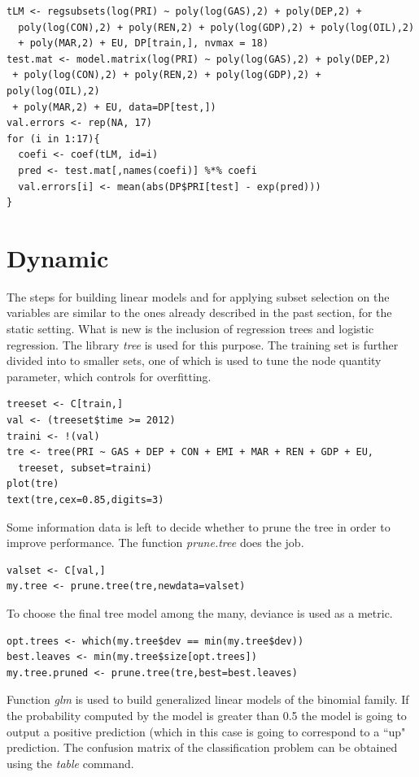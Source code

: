 \documentclass[a4paper,12pt]{book}
\begin{document}
\begin{verbatim}
tLM <- regsubsets(log(PRI) ~ poly(log(GAS),2) + poly(DEP,2) +
  poly(log(CON),2) + poly(REN,2) + poly(log(GDP),2) + poly(log(OIL),2)
  + poly(MAR,2) + EU, DP[train,], nvmax = 18)
test.mat <- model.matrix(log(PRI) ~ poly(log(GAS),2) + poly(DEP,2)
 + poly(log(CON),2) + poly(REN,2) + poly(log(GDP),2) + poly(log(OIL),2)
 + poly(MAR,2) + EU, data=DP[test,])
val.errors <- rep(NA, 17)
for (i in 1:17){
  coefi <- coef(tLM, id=i)
  pred <- test.mat[,names(coefi)] %*% coefi
  val.errors[i] <- mean(abs(DP$PRI[test] - exp(pred)))
}
\end{verbatim}

\section*{Dynamic}

The steps for building linear models and for applying subset selection on the variables are similar to the ones already described in the past section, for the static setting. What is new is the inclusion of regression trees and logistic regression. The library \textit{tree} is used for this purpose. The training set is further divided into to smaller sets, one of which is used to tune the node quantity parameter, which controls for overfitting.

\begin{verbatim}
treeset <- C[train,]
val <- (treeset$time >= 2012)
traini <- !(val)
tre <- tree(PRI ~ GAS + DEP + CON + EMI + MAR + REN + GDP + EU,
  treeset, subset=traini)
plot(tre)
text(tre,cex=0.85,digits=3)
\end{verbatim}

Some information data is left to decide whether to prune the tree in order to improve performance. The function \textit{prune.tree} does the job.

\begin{verbatim}
valset <- C[val,]
my.tree <- prune.tree(tre,newdata=valset)
\end{verbatim}

To choose the final tree model among the many, deviance is used as a metric.

\begin{verbatim}
opt.trees <- which(my.tree$dev == min(my.tree$dev))
best.leaves <- min(my.tree$size[opt.trees])
my.tree.pruned <- prune.tree(tre,best=best.leaves)
\end{verbatim}

Function \textit{glm} is used to build generalized linear models of the binomial family. If the probability computed by the model is greater than 0.5 the model is going to output a positive prediction (which in this case is going to correspond to a ``up" prediction. The confusion matrix of the classification problem can be obtained using the \textit{table} command.
\end{document}
